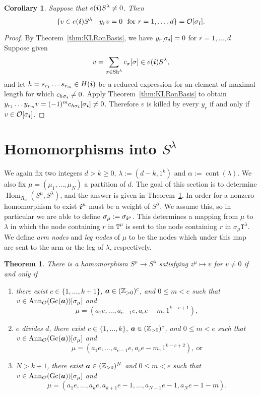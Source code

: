 \documentclass[twoside,11pt,reqno,letter]{amsart}
\numberwithin{equation}{section}
\newtheorem{Theorem}[equation]{Theorem}
\newtheorem{Corollary}[equation]{Corollary}
\theoremstyle{definition}  %
\def\bi{\text{\boldmath$i$}}
\def\ba{\text{\boldmath$a$}}
\newcommand{\Hom}{\operatorname{Hom}}
\newcommand{\Gc}{\operatorname{Gc}}
\newcommand{\Sh}{\operatorname{Sh}}
\newcommand{\cont}{\operatorname{cont}}
\newcommand{\Z}{\mathbb{Z}}
\newcommand{\0}{{\bar 0}}
\newcommand{\1}{{\bar 1}}
\newcommand{\la}{\lambda}
\newcommand{\al}{\alpha}
\newcommand{\si}{\sigma}
\newcommand{\Ann}{{\mathrm {Ann}}}
\def\T{{\mathtt T}}
\renewcommand\O{\mathcal O}
\begin{document}
{\begin{Corollary}\label{cor:Extreme}
  Suppose that $e(\bi)S^\la \neq 0$. Then
  \[
    \{v \in e(\bi)S^\la\ |\ y_r v = 0\ \textup{ for } r = 1, \dots, d\} = \O [\si_\bi].
  \]
\end{Corollary}

\begin{proof}
  By Theorem~\ref{thm:KLRonBasis}, we have $y_r [\si_\bi] = 0$ for $r = 1, \dots, d$.
  Suppose given
  \[
    v = \sum_{\si \in \Sh^\la}{c_\si [\si]} \in e(\bi)S^\la,
  \]
  and let $h = s_{r_1} \dots s_{r_m} \in H(\bi)$ be a reduced expression for an element of maximal length for which $c_{h\si_\bi} \neq 0$. Apply Theorem~\ref{thm:KLRonBasis} to obtain $y_{r_1} \dots y_{r_m} v = (-1)^m c_{h\si_\bi} [\si_\bi] \neq 0$. Therefore $v$ is killed by every $y_r$ if and only if $v \in \O[\si_\bi]$.
\end{proof}













\section{Homomorphisms into $S^\la$}

We again fix two integers $d > k \geq 0$,  $\la := (d-k,1^k)$ and $\al := \cont(\la)$. We also fix $\mu = (\mu_1, \dots, \mu_N)$ a partition of $d$. The goal of this section is to determine $\Hom_{R_\al}(S^\mu, S^\la)$, and the answer is given in Theorem~\ref{thm:mainHom}. In order for a nonzero homomorphism to exist $\bi^\mu$ must be a weight of $S^\la$. We assume this, so in particular we are able to define $\si_\mu := \si_{\bi^\mu}$. This determines a mapping from $\mu$ to $\la$ in which the node containing $r$ in $\T^\mu$ is sent to the node containing $r$ in $\si_\mu \T^\la$. We define \emph{arm nodes} and \emph{leg nodes} of $\mu$ to be the nodes which under this map are sent to the arm or the leg of $\la$, respectively.

\begin{Theorem}\label{thm:mainHom}
  There is a homomorphism $S^\mu \to S^\la$ satisfying $z^\mu \mapsto v$ for $v \neq 0$ if and only if
  \begin{enumerate}
    \item there exist $c \in \{1, \dots, k+1\}$, $\ba \in (\Z_{>0})^c$, and $0 \leq m < e$ such that $v \in \Ann_\O(\Gc(\ba)) [\si_\mu]$ and
$$\mu = (a_1 e, \dots, a_{c-1} e, a_c e - m, 1^{k-c+1}),$$
    \item $e$ divides $d$, there exist $c \in \{1, \dots, k\}$, $\ba \in (\Z_{>0})^c$, and $0 \leq m < e$ such that $v \in \Ann_\O(\Gc(\ba)) [\si_\mu]$ and
$$\mu = (a_1 e, \dots, a_{c-1} e, a_c e - m, 1^{k-c+2}),\ \text{or}$$
    \item $N > k+1$, there exist $\ba \in (\Z_{>0})^N$ and $0 \leq m < e$ such that $v \in \Ann_\O(\Gc(\ba)) [\si_\mu]$ and
$$\mu = (a_1 e, \dots, a_k e, a_{k+1}e - 1, \dots, a_{N-1} e - 1, a_N e - 1 - m).$$
  \end{enumerate}
\end{Theorem}

}
\end{document}
